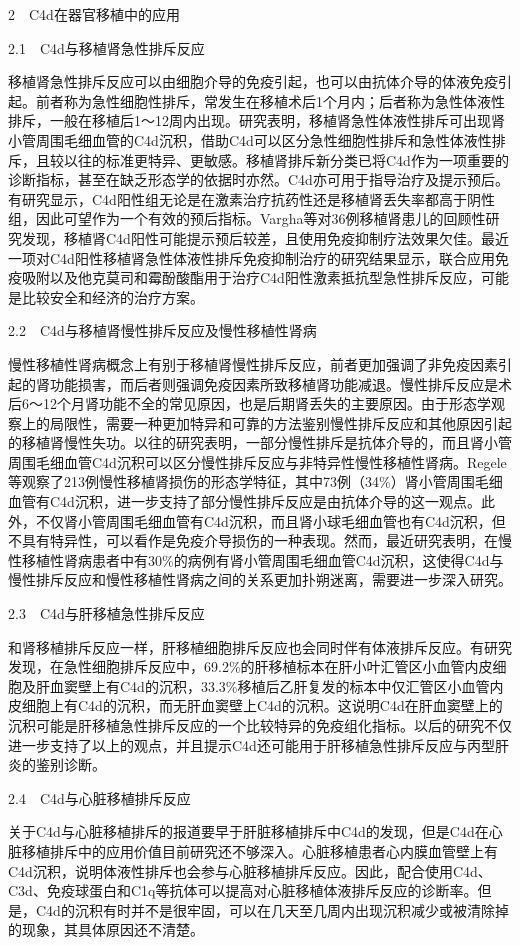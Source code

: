 2　C4d在器官移植中的应用

2.1　C4d与移植肾急性排斥反应

移植肾急性排斥反应可以由细胞介导的免疫引起，也可以由抗体介导的体液免疫引起。前者称为急性细胞性排斥，常发生在移植术后1个月内；后者称为急性体液性排斥，一般在移植后1～12周内出现。研究表明，移植肾急性体液性排斥可出现肾小管周围毛细血管的C4d沉积，借助C4d可以区分急性细胞性排斥和急性体液性排斥，且较以往的标准更特异、更敏感。移植肾排斥新分类已将C4d作为一项重要的诊断指标，甚至在缺乏形态学的依据时亦然。C4d亦可用于指导治疗及提示预后。有研究显示，C4d阳性组无论是在激素治疗抗药性还是移植肾丢失率都高于阴性组，因此可望作为一个有效的预后指标。Vargha等对36例移植肾患儿的回顾性研究发现，移植肾C4d阳性可能提示预后较差，且使用免疫抑制疗法效果欠佳。最近一项对C4d阳性移植肾急性体液性排斥免疫抑制治疗的研究结果显示，联合应用免疫吸附以及他克莫司和霉酚酸酯用于治疗C4d阳性激素抵抗型急性排斥反应，可能是比较安全和经济的治疗方案。

2.2　C4d与移植肾慢性排斥反应及慢性移植性肾病

慢性移植性肾病概念上有别于移植肾慢性排斥反应，前者更加强调了非免疫因素引起的肾功能损害，而后者则强调免疫因素所致移植肾功能减退。慢性排斥反应是术后6～12个月肾功能不全的常见原因，也是后期肾丢失的主要原因。由于形态学观察上的局限性，需要一种更加特异和可靠的方法鉴别慢性排斥反应和其他原因引起的移植肾慢性失功。以往的研究表明，一部分慢性排斥是抗体介导的，而且肾小管周围毛细血管C4d沉积可以区分慢性排斥反应与非特异性慢性移植性肾病。Regele等观察了213例慢性移植肾损伤的形态学特征，其中73例（34\%）肾小管周围毛细血管有C4d沉积，进一步支持了部分慢性排斥反应是由抗体介导的这一观点。此外，不仅肾小管周围毛细血管有C4d沉积，而且肾小球毛细血管也有C4d沉积，但不具有特异性，可以看作是免疫介导损伤的一种表现。然而，最近研究表明，在慢性移植性肾病患者中有30\%的病例有肾小管周围毛细血管C4d沉积，这使得C4d与慢性排斥反应和慢性移植性肾病之间的关系更加扑朔迷离，需要进一步深入研究。

2.3　C4d与肝移植急性排斥反应

和肾移植排斥反应一样，肝移植细胞排斥反应也会同时伴有体液排斥反应。有研究发现，在急性细胞排斥反应中，69.2\%的肝移植标本在肝小叶汇管区小血管内皮细胞及肝血窦壁上有C4d的沉积，33.3\%移植后乙肝复发的标本中仅汇管区小血管内皮细胞上有C4d的沉积，而无肝血窦壁上C4d的沉积。这说明C4d在肝血窦壁上的沉积可能是肝移植急性排斥反应的一个比较特异的免疫组化指标。以后的研究不仅进一步支持了以上的观点，并且提示C4d还可能用于肝移植急性排斥反应与丙型肝炎的鉴别诊断。

2.4　C4d与心脏移植排斥反应

关于C4d与心脏移植排斥的报道要早于肝脏移植排斥中C4d的发现，但是C4d在心脏移植排斥中的应用价值目前研究还不够深入。心脏移植患者心内膜血管壁上有C4d沉积，说明体液性排斥也会参与心脏移植排斥反应。因此，配合使用C4d、C3d、免疫球蛋白和C1q等抗体可以提高对心脏移植体液排斥反应的诊断率。但是，C4d的沉积有时并不是很牢固，可以在几天至几周内出现沉积减少或被清除掉的现象，其具体原因还不清楚。

